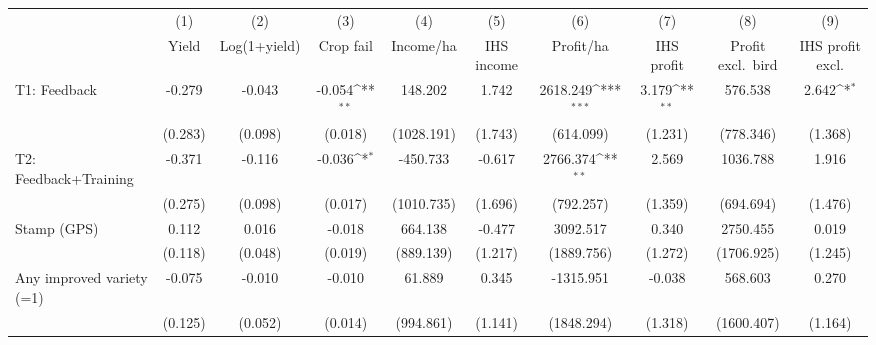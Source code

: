 {
\def\sym#1{\ifmmode^{#1}\else\(^{#1}\)\fi}
\begin{tabular}{l*{9}{c}}
\toprule
                    &\multicolumn{1}{c}{(1)}&\multicolumn{1}{c}{(2)}&\multicolumn{1}{c}{(3)}&\multicolumn{1}{c}{(4)}&\multicolumn{1}{c}{(5)}&\multicolumn{1}{c}{(6)}&\multicolumn{1}{c}{(7)}&\multicolumn{1}{c}{(8)}&\multicolumn{1}{c}{(9)}\\
                    &\multicolumn{1}{c}{Yield}&\multicolumn{1}{c}{Log(1+yield)}&\multicolumn{1}{c}{Crop fail}&\multicolumn{1}{c}{Income/ha}&\multicolumn{1}{c}{IHS income}&\multicolumn{1}{c}{Profit/ha}&\multicolumn{1}{c}{IHS profit}&\multicolumn{1}{c}{Profit excl.\ bird}&\multicolumn{1}{c}{IHS profit excl.}\\
\midrule
T1: Feedback        &      -0.279         &      -0.043         &      -0.054\sym{**} &     148.202         &       1.742         &    2618.249\sym{***}&       3.179\sym{**} &     576.538         &       2.642\sym{*}  \\
                    &     (0.283)         &     (0.098)         &     (0.018)         &  (1028.191)         &     (1.743)         &   (614.099)         &     (1.231)         &   (778.346)         &     (1.368)         \\
T2: Feedback+Training&      -0.371         &      -0.116         &      -0.036\sym{*}  &    -450.733         &      -0.617         &    2766.374\sym{**} &       2.569         &    1036.788         &       1.916         \\
                    &     (0.275)         &     (0.098)         &     (0.017)         &  (1010.735)         &     (1.696)         &   (792.257)         &     (1.359)         &   (694.694)         &     (1.476)         \\
Stamp (GPS)         &       0.112         &       0.016         &      -0.018         &     664.138         &      -0.477         &    3092.517         &       0.340         &    2750.455         &       0.019         \\
                    &     (0.118)         &     (0.048)         &     (0.019)         &   (889.139)         &     (1.217)         &  (1889.756)         &     (1.272)         &  (1706.925)         &     (1.245)         \\
Any improved variety (=1)&      -0.075         &      -0.010         &      -0.010         &      61.889         &       0.345         &   -1315.951         &      -0.038         &     568.603         &       0.270         \\
                    &     (0.125)         &     (0.052)         &     (0.014)         &   (994.861)         &     (1.141)         &  (1848.294)         &     (1.318)         &  (1600.407)         &     (1.164)         \\

\end{tabular}}
